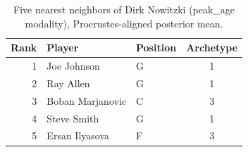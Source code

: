 \begin{table}[htbp]
  \centering\small
  \begin{tabular}{rllc}
    \toprule
    Rank & Player & Position & Archetype \\
    \midrule
    1 & Joe Johnson & G & 1 \\
    2 & Ray Allen & G & 1 \\
    3 & Boban Marjanovic & C & 3 \\
    4 & Steve Smith & G & 1 \\
    5 & Ersan Ilyasova & F & 3 \\
    \bottomrule
  \end{tabular}
  \caption{Five nearest neighbors of Dirk Nowitzki (peak_age modality), Procrustes-aligned posterior mean.}
  \label{tab:Dirk_Nowitzki_neighbors_peak_age}
\end{table}

